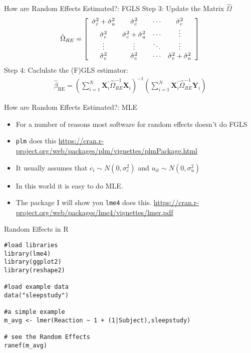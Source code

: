 \documentclass[aspectratio=169]{beamer}
\begin{document}
\begin{frame}{How are Random Effects Estimated?: FGLS}
Step 3: Update the Matrix $\widehat{\Omega}$
\begin{align*}
\hat { \Omega }_{RE} = \left[ \begin{array} { c c c c } { \hat { \sigma } _ { c } ^ { 2 } + \hat { \sigma } _ { u } ^ { 2 } } & { \hat { \sigma } _ { c } ^ { 2 } } & { \cdots } & { \hat { \sigma } _ { c } ^ { 2 } } \\ { \hat { \sigma } _ { c } ^ { 2 } } & { \hat { \sigma } _ { c } ^ { 2 } + \hat { \sigma } _ { u } ^ { 2 } } & { \cdots } & { \vdots } \\ { \vdots } & { \vdots } & { \ddots } & { \vdots } \\ { \hat { \sigma } _ { c } ^ { 2 } } & { \hat { \sigma } _ { c } ^ { 2 } } & { \cdots } & { \hat { \sigma } _ { c } ^ { 2 } + \hat { \sigma } _ { u } ^ { 2 } } \end{array} \right]
\end{align*}
Step 4: Caclulate the (F)GLS estimator:
\begin{align*}
\hat { \beta} _ { \mathrm { RE } } = \left( \sum _ { i = 1 } ^ { N } \mathbf{X} _ { i } ^ { \prime } \hat { \Omega }_{RE} ^ { - 1 } \mathbf{X} _ { i } \right) ^ { - 1 } \left( \sum _ { i = 1 } ^ { N } \mathbf{X} _ { i } ^ { \prime } \hat { \Omega }_{RE} ^ { - 1 } \mathbf{Y} _ { i } \right)
\end{align*}
\end{frame}


\begin{frame}{How are Random Effects Estimated?: MLE}
\begin{itemize}
\item For a number of reasons most software for random effects doesn't do FGLS
\item \texttt{plm} does this \url{https://cran.r-project.org/web/packages/plm/vignettes/plmPackage.html}
\item It usually assumes that $c_i \sim N(0,\sigma_c^2)$ and $u_{it} \sim N(0,\sigma_u^2)$
\item In this world it is easy to do MLE.
\item The package I will show you \texttt{lme4} does this. \url{https://cran.r-project.org/web/packages/lme4/vignettes/lmer.pdf}
\end{itemize}
\end{frame}


\begin{frame}[fragile]{Random Effects in R}
\begin{verbatim}
#load libraries
library(lme4)
library(ggplot2)
library(reshape2)

#load example data
data("sleepstudy")

#a simple example
m_avg <- lmer(Reaction ~ 1 + (1|Subject),sleepstudy) 

# see the Random Effects
ranef(m_avg)
\end{verbatim}
\end{frame}
\end{document}
